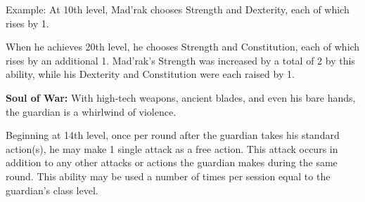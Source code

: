 Example: At 10th level, Mad'rak chooses Strength and Dexterity, each of which rises by 1.

When he achieves 20th level, he chooses Strength and Constitution, each of which rises by an additional 1. Mad'rak's Strength was increased by a total of 2 by this ability, while his Dexterity and Constitution were each raised by 1.

\textbf{Soul of War:} With high-tech weapons, ancient blades, and even his bare hands, the guardian is a whirlwind of violence.

Beginning at 14th level, once per round after the guardian takes his standard action(s), he may make 1 single attack as a free action. This attack occurs in addition to any other attacks or actions the guardian makes during the same round. This ability may be used a number of times per session equal to the guardian's class level.


